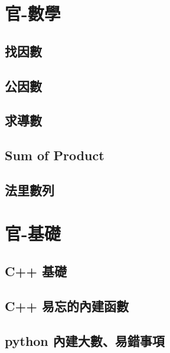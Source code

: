 \section{官-數學}
\subsection{找因數}
\raggedbottom
\hrulefill
\subsection{公因數}
\raggedbottom
\hrulefill
\subsection{求導數}
\raggedbottom
\hrulefill
\subsection{Sum of Product}
\raggedbottom
\hrulefill
\subsection{法里數列}
\raggedbottom
\hrulefill

\section{官-基礎}
\subsection{C++ 基礎}
\raggedbottom
\hrulefill
\subsection{C++ 易忘的內建函數}
\raggedbottom
\hrulefill
\subsection{python 內建大數、易錯事項}
\raggedbottom
\hrulefill

